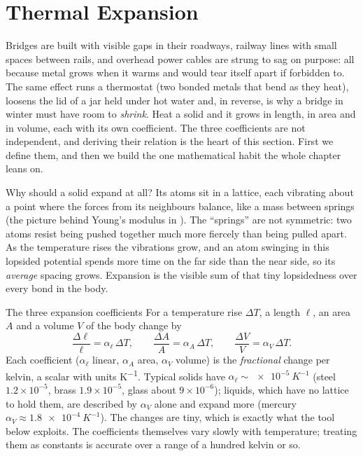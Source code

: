 \section{Thermal Expansion}\label{sec:expansion}

Bridges are built with visible gaps in their roadways, railway lines with small spaces between rails,
and overhead power cables are strung to sag on purpose: all because metal grows when it warms and would
tear itself apart if forbidden to. The same effect runs a thermostat (two bonded metals that bend as
they heat), loosens the lid of a jar held under hot water and, in reverse, is why a bridge in winter
must have room to \emph{shrink}. Heat a solid and it grows in length, in area and in volume, each with
its own coefficient. The three coefficients are not independent, and deriving their relation is the
heart of this section. First we define them, and then we build the one mathematical habit the whole
chapter leans on.

Why should a solid expand at all? Its atoms sit in a lattice, each vibrating about a point where the
forces from its neighbours balance, like a mass between springs (the picture behind Young's modulus in
). The ``springs'' are not symmetric: two atoms resist being pushed together much more
fiercely than being pulled apart. As the temperature rises the vibrations grow, and an atom swinging
in this lopsided potential spends more time on the far side than the near side, so its \emph{average}
spacing grows. Expansion is the visible sum of that tiny lopsidedness over every bond in the body.

\begin{defbox}{The three expansion coefficients}
For a temperature rise $\Delta T$, a length $\ell$, an area $A$ and a volume $V$ of the body change by
\[
\frac{\Delta \ell}{\ell} = \alpha_\ell\,\Delta T, \qquad
\frac{\Delta A}{A} = \alpha_A\,\Delta T, \qquad
\frac{\Delta V}{V} = \alpha_V\,\Delta T .
\]
Each coefficient ($\alpha_\ell$ linear, $\alpha_A$ area, $\alpha_V$ volume) is the \emph{fractional}
change per kelvin, a scalar with units \si{K^{-1}}. Typical solids have
$\alpha_\ell \sim \SI{e-5}{K^{-1}}$ (steel $1.2\times10^{-5}$, brass $1.9\times10^{-5}$, glass
about $9\times10^{-6}$); liquids, which have no lattice to hold them, are described by $\alpha_V$ alone
and expand more (mercury $\alpha_V\approx\SI{1.8e-4}{K^{-1}}$). The changes are tiny, which is exactly
what the tool below exploits. The coefficients themselves vary slowly with temperature; treating them
as constants is accurate over a range of a hundred kelvin or so.
\end{defbox}

